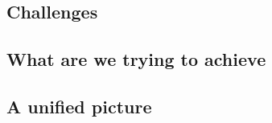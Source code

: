 \subsection{Challenges}
\subsection{What are we trying to achieve}
\subsection{A unified picture}



\clearpage
\cite{2014MNRAS.440.2290M}

\cite{2014MNRAS.439.2651M}

\cite{2014A&A...567A..65B}

\cite{2014MNRAS.445.3382M}

\cite{2014arXiv1410.6826M}

\cite{2015PASJ...67...21M}

\cite{2015arXiv150403388M}





